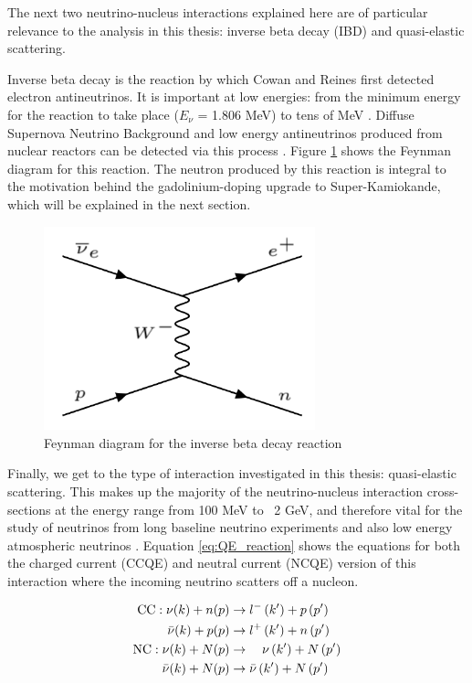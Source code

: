The next two neutrino-nucleus interactions explained here are of particular relevance to the analysis in this thesis: inverse beta decay (IBD) and quasi-elastic scattering. 

Inverse beta decay is the reaction by which Cowan and Reines first detected electron antineutrinos. It is important at low energies: from the minimum energy for the reaction to take place ($E_{\nu}$ = 1.806 MeV) to tens of MeV \cite{oralbaev2016inverse}. Diffuse Supernova Neutrino Background and low energy antineutrinos produced from nuclear reactors can be detected via this process \cite{li2022prospects}. Figure \ref{fig:IBD_feynman} shows the Feynman diagram for this reaction. The neutron produced by this reaction is integral to the motivation behind the gadolinium-doping upgrade to Super-Kamiokande, which will be explained in the next section.

\begin{figure}
    \centering
    \includegraphics[width=0.7\textwidth]{Figures/IBD_feynman.png}
    \caption{Feynman diagram for the inverse beta decay reaction}
    \label{fig:IBD_feynman}
\end{figure}

Finally, we get to the type of interaction investigated in this thesis: quasi-elastic scattering. This makes up the majority of the neutrino-nucleus interaction cross-sections at the energy range from 100 MeV to ~2 GeV, and therefore vital for the study of neutrinos from long baseline neutrino experiments and also low energy atmospheric neutrinos \cite{wan2019measurement}. Equation \ref{eq:QE_reaction} shows the equations for both the charged current (CCQE) and neutral current (NCQE) version of this interaction where the incoming neutrino scatters off a nucleon.


\begin{align} 
\mathrm{CC}: \nu(k)+n(p) & \rightarrow l^{-}\left(k^{\prime}\right)+p\left(p^{\prime}\right) \label{eq:QE_reaction}\\
\bar{\nu}(k)+p(p) & \rightarrow l^{+}\left(k^{\prime}\right)+n\left(p^{\prime}\right) \notag\\
\mathrm{NC}: \nu(k)+N(p) & \rightarrow \quad \nu\left(k^{\prime}\right)+N\left(p^{\prime}\right) \notag \\
\bar{\nu}(k)+N(p) & \rightarrow \bar{\nu}\left(k^{\prime}\right)+N\left(p^{\prime}\right) \notag 
\end{align}



